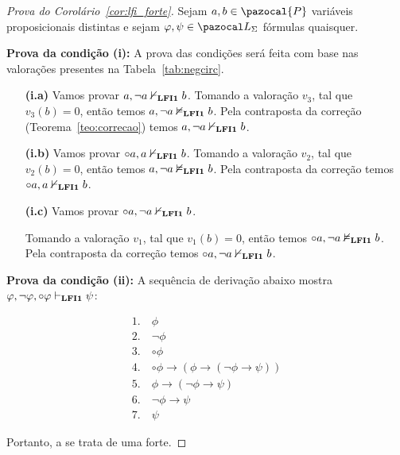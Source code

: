     \begin{proof}[Prova do Corolário~\ref{cor:lfi_forte}]
        Sejam $a, b \in \pazocal{P}$ variáveis proposicionais distintas e sejam $\phi, \psi \in \ling{}$ fórmulas quaisquer.
        
        \noindent\textbf{Prova da condição (i):} A prova das condições será feita com base nas valorações presentes na Tabela~\ref{tab:negcirc}.

        \begin{itemize}
            \item[\textbf{(i.a)}] Vamos provar $a, \neg a \nvdash_{{\normalfont\textbf{LFI1}}{}} b$.
                                  Tomando a valoração $v_3$, tal que $v_3(b) = 0$, então temos $a, \neg a \nvDash_{{\normalfont\textbf{LFI1}}{}} b$. Pela contraposta da correção (Teorema~\ref{teo:correcao}) temos  $a, \neg a \nvdash_{{\normalfont\textbf{LFI1}}{}} b$.
            \item[\textbf{(i.b)}] Vamos provar $\circ a, a \nvdash_{{\normalfont\textbf{LFI1}}{}} b$.
                                  Tomando a valoração $v_2$, tal que $v_2(b) = 0$, então temos $a, \neg a \nvDash_{{\normalfont\textbf{LFI1}}{}} b$. Pela contraposta da correção temos $\circ a, a \nvdash_{{\normalfont\textbf{LFI1}}{}} b$.
            \item[\textbf{(i.c)}] Vamos provar $\circ a, \neg a \nvdash_{{\normalfont\textbf{LFI1}}{}} b$.

                                  Tomando a valoração $v_1$, tal que $v_1(b) = 0$, então temos $\circ a, \neg a \nvDash_{{\normalfont\textbf{LFI1}}{}} b$. Pela contraposta da correção temos $\circ a, \neg a \nvdash_{{\normalfont\textbf{LFI1}}{}} b$.
            
        \end{itemize}


        \noindent\textbf{Prova da condição (ii):} A sequência de derivação abaixo mostra $\varphi, \neg \varphi, \circ \varphi \vdash_{{\normalfont\textbf{LFI1}}{}} \psi$:

        \begin{align*}
            1.~ & \phi \tag{Premissa}       \\
            2.~ & \neg \phi \tag{Premissa}  \\
            3.~ & \circ \phi \tag{Premissa} \\
            4.~ & \circ \phi \to (\phi \to (\neg \phi \to \psi)) \tag{bc1} \\
            5.~ & \phi \to (\neg \phi \to \psi) \tag{MP 3, 4} \\
            6.~ & \neg \phi \to \psi \tag{MP 1, 5} \\
            7.~ & \psi \tag{MP 2, 6}
        \end{align*}


        Portanto, a \lfium{} se trata de uma \lfi{} forte.
    \end{proof}

